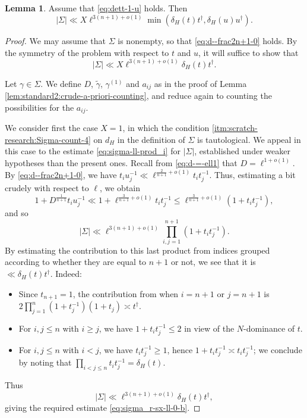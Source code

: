 \documentclass[reqno]{amsart}
\theoremstyle{plain} \newtheorem{theorem} {Theorem}
\theoremstyle{definition} \newtheorem{definition} [theorem] {Definition}
\theoremstyle{itplain} %
\newtheorem{lemma}[theorem]{Lemma}
\numberwithin{equation}{section}
\numberwithin{theorem}{section}
\renewcommand{\geq}{\geqslant}
\renewcommand{\leq}{\leqslant}
\begin{document}
\begin{lemma}\label{lem:standard2:we-have-begin}
  Assume that \eqref{eq:dett-1-u} holds.  Then
  \begin{equation}\label{eq:sigma_r-sx-ll-0}
    |\Sigma| \ll X \ell^{3 (n+1) + o(1)}
    \min(\delta_H(t) t ^\dagger , \delta_H(u) u ^\dagger).
  \end{equation}
\end{lemma}
\begin{proof}
  We may assume that $\Sigma$ is nonempty, so that \eqref{eq:d--frac2n+1-0} holds.  By the symmetry of the problem with respect to $t$ and $u$, it will suffice to show that
  \begin{equation}\label{eq:sigma_r-sx-ll-0-b}
    |\Sigma| \ll X \ell^{3 (n+1) + o(1)}
    \delta_H(t) t ^\dagger.
  \end{equation}

  Let $\gamma \in \Sigma$.  We define $D$, $\tilde{\gamma}$, $\gamma^{(1)}$ and $a_{i j}$ as in the proof of Lemma \ref{lem:standard2:crude-a-priori-counting}, and reduce again to counting the possibilities for the $a_{i j}$.  

  We consider first the case $X = 1$, in which the condition \eqref{itm:scratch-research:Sigma-count-4} on $d_H$ in the definition of $\Sigma$ is tautological.  We appeal in this case to the estimate \eqref{eq:sigma-ll-prod_i} for $|\Sigma|$, established under weaker hypotheses than the present ones.  Recall from \eqref{eq:d-=-ell1} that $D = \ell^{1 + o(1)}$.  By \eqref{eq:d--frac2n+1-0}, we have $t_i u_j^{-1} \ll \ell ^{\frac{2}{n+1} + o(1)} t_i t_j^{-1}$.  Thus, estimating a bit crudely with respect to $\ell$, we obtain
  \begin{equation*}
    1 + D ^{\frac{1}{n + 1}} t_i u_j^{-1}
    \ll
    1 +
    \ell ^{\frac{3}{n+1} + o(1)} t_i t_j^{-1}
    \leq
    \ell ^{\frac{3}{n+1} + o(1)}(1 +
    t_i t_j^{-1}),
  \end{equation*}
  and so
  \begin{equation*}
    |\Sigma| \ll \ell ^{3 (n+1) + o(1)} \prod_{i,j=1}^{n+1} (1 + t_i t_j^{-1}).
  \end{equation*}
  By estimating the contribution to this last product from indices grouped according to whether they are equal to $n+1$ or not, we see that it is $\ll \delta_H(t) t ^\dagger$.  Indeed:
  \begin{itemize}
  \item Since $t_{n+1} = 1$, the contribution from when $i=n+1$ or $j=n+1$ is $2 \prod_{j=1}^{n} (1 + t_j^{-1}) (1 + t_j) \asymp t ^\dagger$.
  \item For $i,j \leq n$ with $i \geq j$, we have $1 + t_i t_j^{-1} \leq 2$ in view of the $N$-dominance of $t$.
  \item For $i,j \leq n$ with $i < j$, we have $t_i t_j^{-1} \geq 1$, hence $1 + t_i t_j^{-1} \asymp t_i t_j^{-1}$; we conclude by noting that $\prod_{i < j \leq n} t_i t_j^{-1} = \delta_H(t)$.
  \end{itemize}
  Thus
  \begin{equation}\label{eq:sigma-ll-ell3}
    |\Sigma| \ll \ell^{3 (n+1) + o(1)}
    \delta_H(t) t ^\dagger,
  \end{equation}
  giving the required estimate \eqref{eq:sigma_r-sx-ll-0-b}.


\end{proof}
\end{document}
